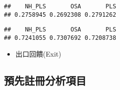 \documentclass[
]{article}
\newenvironment{Shaded}{\begin{snugshade}}{\end{snugshade}}
\newcommand{\DecValTok}[1]{\textcolor[rgb]{0.00,0.00,0.81}{#1}}
\newcommand{\DocumentationTok}[1]{\textcolor[rgb]{0.56,0.35,0.01}{\textbf{\textit{#1}}}}
\newcommand{\FunctionTok}[1]{\textcolor[rgb]{0.00,0.00,0.00}{#1}}
\newcommand{\NormalTok}[1]{#1}
\newcommand{\SpecialCharTok}[1]{\textcolor[rgb]{0.00,0.00,0.00}{#1}}
\providecommand{\tightlist}{%
  \setlength{\itemsep}{0pt}\setlength{\parskip}{0pt}}
\begin{document}
\begin{Shaded}
\end{Shaded}

\begin{verbatim}
##    NH_PLS       OSA       PLS 
## 0.2758945 0.2692308 0.2791262
\end{verbatim}

\begin{Shaded}
\end{Shaded}

\begin{verbatim}
##    NH_PLS       OSA       PLS 
## 0.7241055 0.7307692 0.7208738
\end{verbatim}

\begin{itemize}
\tightlist
\item
  出口回饋(Exit)
\end{itemize}

\hypertarget{ux9810ux5148ux8a3bux518aux5206ux6790ux9805ux76ee}{%
\subsection{預先註冊分析項目}\label{ux9810ux5148ux8a3bux518aux5206ux6790ux9805ux76ee}}
\end{document}
